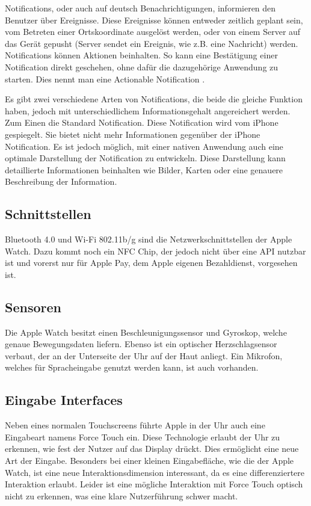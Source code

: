 Notifications, oder auch auf deutsch Benachrichtigungen, informieren den Benutzer über Ereignisse. Diese Ereignisse können entweder zeitlich geplant sein, vom Betreten einer Ortskoordinate ausgelöst werden, oder von einem Server auf das Gerät gepusht (Server sendet ein Ereignis, wie z.B. eine Nachricht) werden. Notifications können Aktionen beinhalten. So kann eine Bestätigung einer Notification direkt geschehen, ohne dafür die dazugehörige Anwendung zu starten. Dies nennt man eine Actionable Notification \cite{Apple:2015devAw}.

Es gibt zwei verschiedene Arten von Notifications, die beide die gleiche Funktion haben, jedoch mit unterschiedlichem Informationsgehalt angereichert werden. Zum Einen die Standard Notification. Diese Notification wird vom iPhone gespiegelt. Sie bietet nicht mehr Informationen gegenüber der iPhone Notification. Es ist jedoch möglich, mit einer nativen Anwendung auch eine optimale Darstellung der Notification zu entwickeln. Diese Darstellung kann detaillierte Informationen beinhalten wie Bilder, Karten oder eine genauere Beschreibung der Information\cite{Apple:2015notif}.

\subsection{Schnittstellen}
Bluetooth 4.0 und Wi-Fi 802.11b/g sind die Netzwerkschnittstellen der Apple Watch. Dazu kommt noch ein NFC Chip, der jedoch nicht über eine API nutzbar ist und vorerst nur für Apple Pay, dem Apple eigenen Bezahldienst, vorgesehen ist\cite{RITCHIE:2015aa}. 
\subsection{Sensoren}
Die Apple Watch besitzt einen Beschleunigungssensor und Gyroskop, welche genaue Bewegungsdaten liefern. Ebenso ist ein optischer Herzschlagsensor verbaut, der an der Unterseite der Uhr auf der Haut anliegt. Ein Mikrofon, welches für Spracheingabe genutzt werden kann, ist auch vorhanden.

\subsection{Eingabe Interfaces}
\label{ch:eingabe_interface}
Neben eines normalen Touchscreens führte Apple in der Uhr auch eine Eingabeart namens Force Touch ein. Diese Technologie erlaubt der Uhr zu erkennen, wie fest der Nutzer auf das Display drückt. Dies ermöglicht eine neue Art der Eingabe. Besonders bei einer kleinen Eingabefläche, wie die der Apple Watch, ist eine neue Interaktionsdimension interessant, da es eine differenziertere Interaktion erlaubt. Leider ist eine mögliche Interaktion mit Force Touch optisch nicht zu erkennen, was eine klare Nutzerführung schwer macht.

